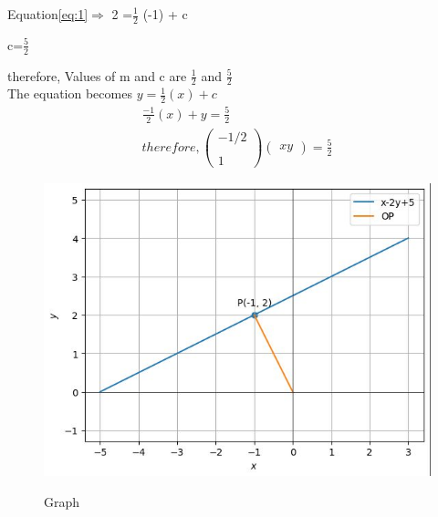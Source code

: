 \documentclass[12pt]{article}
\begin{document}
Equation\eqref{eq:1}$\Longrightarrow$  2 =\large{$\frac{1}{2}$} (-1) + c \\
\begin{center}
 c=\large{\textbf{$\frac{5}{2}$}} \\   
\end{center}

therefore,  Values of m and c are $\frac{1}{2}$ and $\frac{5}{2}$ \\

The equation becomes $y=\frac{1}{2}(x) + c$ \\
\begin{align}
 \frac{-1}{2}(x) + y = \frac{5}{2} \\
therefore,
  \begin{pmatrix}
    -1/2\\ \\  1
  \end{pmatrix}
  \begin{pmatrix}
    x    y
  \end{pmatrix}
  =\frac{5}{2}\nonumber
\end{align}
\begin{figure}[H]
	\includegraphics[width=1 \columnwidth]{graph.jpg}\\
	\caption{Graph}
	\label{fig:pic}
\end{figure}
 
\end{document}
